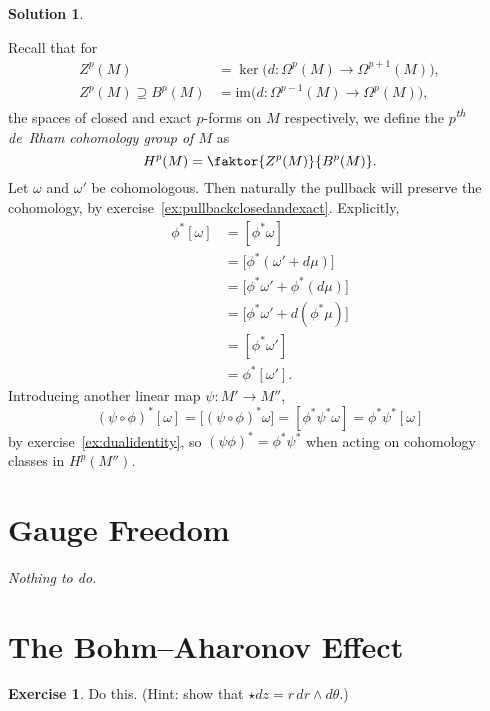 \documentclass[11pt, a4paper]{report}
\theoremstyle{definition}
\newtheorem{ex}{Exercise}[part]
\newtheorem{sol}{Solution}[part]
\begin{document}
\begin{sol}\label{sol:pullbackcohomology}

Recall that for
\begin{align*}
    Z^p(M) &= \ker \bigl( d: \Omega^p(M) \to \Omega^{p + 1}(M) \bigr), \\
    Z^p(M) \supseteq B^p(M) &= \text{im} \bigl( d: \Omega^{p - 1}(M) \to \Omega^p(M) \bigr),
\end{align*}
the spaces of closed and exact $p$-forms on $M$ respectively, we define the \emph{$p$\textsuperscript{th} de~Rham cohomology group of $M$} as
\[
    H^p(M) = \faktor{Z^p(M)}{B^p(M)}.
\]
Let $\omega$ and $\omega'$ be cohomologous. Then naturally the pullback will preserve the cohomology, by exercise~\ref{ex:pullbackclosedandexact}. Explicitly,
\begin{align*}
    \phi^*[\omega] &= [\phi^* \omega] \\
                   &= \bigl[ \phi^*(\omega' + d\mu) \bigr] \\
                   &= \bigl[ \phi^* \omega' + \phi^* (d\mu) \bigr] \\
                   &= \bigl[ \phi^* \omega' + d(\phi^*\mu) \bigr] \\
                   &= [\phi^* \omega'] \\
                   &= \phi^* [\omega'].
\end{align*}
Introducing another linear map $\psi: M' \to M''$,
\[
    {(\psi \circ \phi)}^*[\omega] = \bigl[ {(\psi \circ \phi)}^* \omega \bigr]
                                  = [\phi^* \psi^* \omega]
                                  = \phi^* \psi^* [\omega]
\]
by exercise~\ref{ex:dualidentity}, so ${(\psi \phi)}^* = \phi^* \psi^*$ when acting on cohomology classes in $H^p(M'')$.

\end{sol}

\section{Gauge Freedom}

\emph{Nothing to do.}

\section{The Bohm--Aharonov Effect}

\begin{ex}

Do this. (Hint: show that $\star dz = r \, dr \wedge d\theta$.)

\end{ex}
\end{document}

